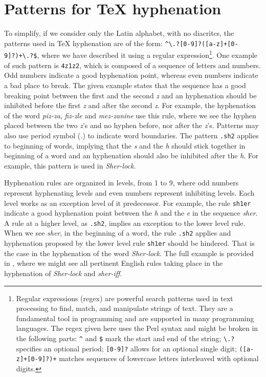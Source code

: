 \documentclass{article}
\begin{document}
\section{Patterns for \TeX{} hyphenation}\label{sec-patt4TeX} 

To simplify, if we consider only the Latin alphabet, with no diacritcs, the patterns used 
in \TeX{} hyphenation are of the form: \texttt{\^{}\textbackslash{}.?[0-9]?([a-z]+[0-9]?)+\textbackslash{}.?\$},
where we have described it using a regular expression\footnote{
    Regular expressions (regex) are powerful search patterns used in text processing to find, match, and manipulate strings of text. They are a fundamental tool in programming and are supported in many programming languages.
    The regex given here uses the Perl syntax and might be broken in the following
    parts: \texttt{\^{}} and \texttt{\$} mark the start and end of the string;
    \texttt{\textbackslash{}.?} specifies an optional period; \texttt{[0-9]?} allows for an optional single digit;
    \texttt{([a-z]+[0-9]?)+} matches sequences of lowercase letters interleaved with optional digits.
}.
One example of such pattern is \texttt{4z1z2}, which is composed of a sequence
of letters and numbers. Odd numbers indicate a
good hyphenation point, whereas even numbers indicate a bad place to break.
The given example states that the sequence has a good breaking point between
the first and the second \emph{z} and an hyphenation should be inhibited before
the first \emph{z} and after the second \emph{z}. For example, the hyphenation
of the word \emph{piz-za}, \emph{fiz-zle} and \emph{mez-zanine} use this rule,
where we see the hyphen placed between the two \emph{z}'s and no hyphen before,
nor after the \emph{z}'s. Patterns may also use period symbol (\emph{.}) to
indicate word boundaries. The pattern \texttt{.sh2} applies to beginning of
words, implying that the \emph{s} and the \emph{h} should stick together in
beginning of a word and an hyphenation should also be inhibited after the
\emph{h}. For example, this pattern is used in \emph{Sher-lock}.

Hyphenation rules are organized in levels, from 1 to 9, where odd numbers
represent hyphenating levels and even numbers represent inhibiting levels. Each
level works as an exception level of it predecessor. For example, the rule
\texttt{sh1er} indicate a good hyphenation point between the \emph{h} and the
\emph{e} in the sequence \emph{sher}. A rule at a higher level, as
\texttt{.sh2}, implies an exception to the lower level rule. When we see
\emph{sher}, in the beginning of a word, the rule \texttt{.sh2} applies and
hyphenation proposed by the lower level rule \texttt{sh1er} should be hindered.
That is the case in the hyphenation of the word \emph{Sher-lock}. The full
example is provided in , where we might see all pertinent
English rules taking place in the hyphenation of \emph{Sher-lock} and \emph{sher-iff}.
\end{document}
